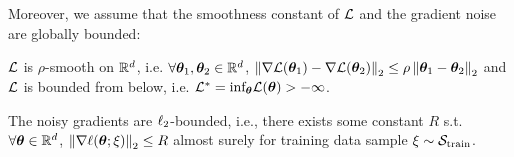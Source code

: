 Moreover, we assume that the smoothness constant of $\mathcal{L}$ and the gradient noise are globally bounded:
\begin{assumption}\label{amp:smooth}
    $\mathcal{L}$ is $\rho$-smooth on $\mathbb{R}^d$, i.e. $\forall {\bm{\theta}}_1,{\bm{\theta}}_2 \in \mathbb{R}^d $, $\left\|\nabla \mathcal{L}({\bm{\theta}}_1) - \nabla \mathcal{L}({\bm{\theta}}_2)\right\|_2 \leq \rho \left\| {\bm{\theta}}_1 - {\bm{\theta}}_2\right\|_2$ and $\mathcal{L}$ is bounded from below, i.e. $\mathcal{L}^* = \text{inf}_{{\bm{\theta}}}\mathcal{L}({\bm{\theta}}) > -\infty$. 
\end{assumption}


\begin{assumption}\label{amp:gradient-bound}
     The noisy gradients are $\ell_2$-bounded, i.e., there exists some constant $R$ s.t. $\forall {\bm{\theta}} \in \mathbb{R}^d$, $ \left\|\nabla \ell({\bm{\theta}}; \xi)\right\|_2 \leq R$ almost surely for training data sample $\xi \sim \mathcal{S}_{\mathrm{train}}$.
     
\end{assumption}


